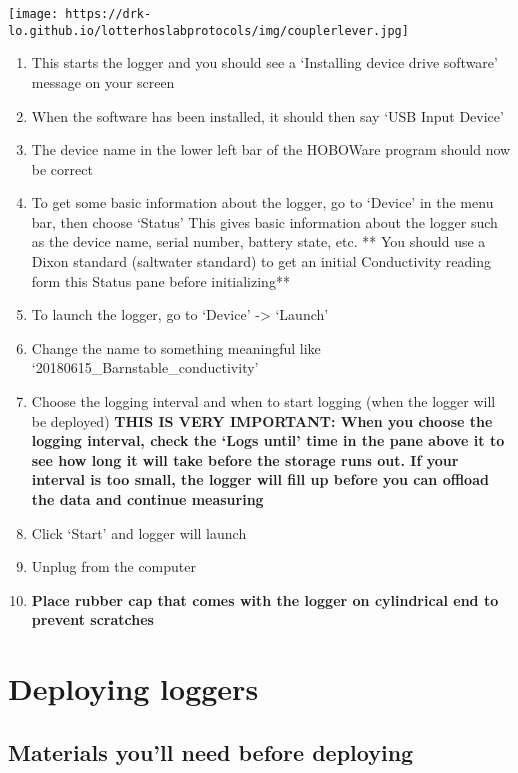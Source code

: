 \documentclass[
  letterpaper,
  DIV=11,
  numbers=noendperiod]{scrreprt}
\begin{document}
\texttt{[image: https://drk-lo.github.io/lotterhoslabprotocols/img/couplerlever.jpg]}

\begin{enumerate}
\def\labelenumi{\arabic{enumi}.}
\item
  This starts the logger and you should see a `Installing device drive
  software' message on your screen
\item
  When the software has been installed, it should then say `USB Input
  Device'
\item
  The device name in the lower left bar of the HOBOWare program should
  now be correct
\item
  To get some basic information about the logger, go to `Device' in the
  menu bar, then choose `Status' This gives basic information about the
  logger such as the device name, serial number, battery state, etc. **
  You should use a Dixon standard (saltwater standard) to get an initial
  Conductivity reading form this Status pane before initializing**
\item
  To launch the logger, go to `Device' -\textgreater{} `Launch'
\item
  Change the name to something meaningful like
  `20180615\_Barnstable\_conductivity'
\item
  Choose the logging interval and when to start logging (when the logger
  will be deployed) \textbf{THIS IS VERY IMPORTANT: When you choose the
  logging interval, check the `Logs until' time in the pane above it to
  see how long it will take before the storage runs out. If your
  interval is too small, the logger will fill up before you can offload
  the data and continue measuring}
\item
  Click `Start' and logger will launch
\item
  Unplug from the computer
\item
  \textbf{Place rubber cap that comes with the logger on cylindrical end
  to prevent scratches}
\end{enumerate}

\hypertarget{deploying-loggers}{%
\section*{\texorpdfstring{\textbf{Deploying
loggers}}{Deploying loggers}}\label{deploying-loggers}}


\hypertarget{materials-youll-need-before-deploying}{%
\subsection*{\texorpdfstring{\textbf{Materials you'll need before
deploying}}{Materials you'll need before deploying}}\label{materials-youll-need-before-deploying}}
\end{document}
